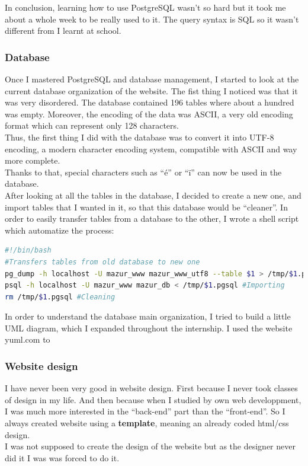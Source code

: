 \documentclass[10pt,a4paper]{article}
\begin{document}
In conclusion, learning how to use PostgreSQL wasn't so hard but it took me about a whole week to be really used to it. The query syntax is SQL so it wasn't different from I learnt at school.

\subsubsection*{Database}
Once I mastered PostgreSQL and database management, I started to look at the current database organization of the website. The fist thing I noticed was that it was very disordered. The database contained 196 tables where about a hundred was empty. Moreover, the encoding of the data was ASCII, a very old encoding format which can represent only 128 characters.\\
Thus, the first thing I did with the database was to convert it into UTF-8 encoding, a modern character encoding system, compatible with ASCII and way more complete.\\ Thanks to that, special characters such as ``é'' or ``ï'' can now be used in the database.\\

After looking at all the tables in the database, I decided to create a new one, and import tables that I wanted in it, so that this database would be ``cleaner''. In order to easily transfer tables from a database to the other, I wrote a shell script which automatize the process:\\

\begin{lstlisting}[language=bash]
#!/bin/bash
#Transfers tables from old database to new one
pg_dump -h localhost -U mazur_www mazur_www_utf8 --table $1 > /tmp/$1.pgsql #Exporting
psql -h localhost -U mazur_www mazur_db < /tmp/$1.pgsql #Importing
rm /tmp/$1.pgsql #Cleaning
\end{lstlisting}

In order to understand the database main organization, I tried to build a little UML diagram, which I expanded throughout the internship. I used the website yuml.com%
to


\subsubsection*{Website design}

I have never been very good in website design. First because I never took classes of design in my life. And then because when I studied by own web developpment, I was much more interested in the ``back-end'' part than the ``front-end''. So I always created website using a \textbf{template}, meaning an already coded html/css design.\\
I was not supposed to create the design of the website but as the designer never did it I was was forced to do it.
\end{document}
